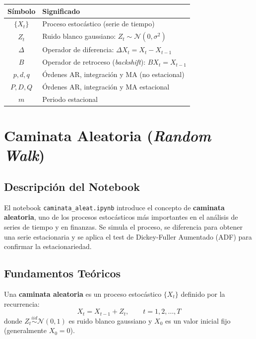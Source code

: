 \documentclass[12pt, a4paper]{article}
\begin{document}
\begin{center}
\renewcommand{\arraystretch}{1.4}
\begin{tabular}{cl}
  \toprule
  \textbf{Símbolo} & \textbf{Significado} \\
  \midrule
  $\{X_t\}$ & Proceso estocástico (serie de tiempo) \\
  $Z_t$     & Ruido blanco gaussiano: $Z_t \sim \mathcal{N}(0,\sigma^2)$ \\
  $\Delta$  & Operador de diferencia: $\Delta X_t = X_t - X_{t-1}$ \\
  $B$       & Operador de retroceso (\textit{backshift}): $B X_t = X_{t-1}$ \\
  $p, d, q$ & Órdenes AR, integración y MA (no estacional) \\
  $P, D, Q$ & Órdenes AR, integración y MA estacional \\
  $m$       & Periodo estacional \\
  \bottomrule
\end{tabular}
\end{center}

\newpage

\section{Caminata Aleatoria (\textit{Random Walk})}

\subsection{Descripción del Notebook}

El notebook \texttt{caminata\_aleat.ipynb} introduce el concepto de
\textbf{caminata aleatoria}, uno de los procesos estocásticos más importantes
en el análisis de series de tiempo y en finanzas. Se simula el proceso, se
diferencia para obtener una serie estacionaria y se aplica el test de
Dickey-Fuller Aumentado (ADF) para confirmar la estacionariedad.

\subsection{Fundamentos Teóricos}

\begin{definicion}
  Una \textbf{caminata aleatoria} es un proceso estocástico $\{X_t\}$ definido
  por la recurrencia:
  \[
    X_t = X_{t-1} + Z_t, \qquad t = 1, 2, \ldots, T
  \]
  donde $Z_t \overset{iid}{\sim} \mathcal{N}(0,1)$ es ruido blanco gaussiano
  y $X_0$ es un valor inicial fijo (generalmente $X_0 = 0$).
\end{definicion}
\end{document}
